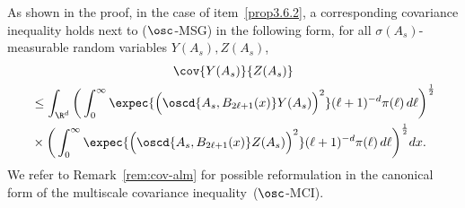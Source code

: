 \begin{rema}
As shown in the proof, in the case of item~\eqref{prop3.6.2}, a corresponding covariance inequality holds next to ($\osc$-MSG) in the following form, for all $\sigma(A_s)$-measurable random variables $Y(A_s),Z(A_s)$,
\begin{multline}\label{eq:MSG-RPM}
\cov{Y(A_s)}{Z(A_s)}\\
\begin{aligned}
&\le \int_{\R^d}\bigg(\int_0^\infty\expec{\Big(\oscd{A_s,B_{2\ell+1}(x)}Y(A_s)\Big)^2}(\ell+1)^{-d}\pi(\ell)\,d\ell\bigg)^\frac12\\
&\times\bigg(\int_0^\infty\expec{\Big(\oscd{A_s,B_{2\ell+1}(x)}Z(A_s)\Big)^2}(\ell+1)^{-d}\pi(\ell)\,d\ell\bigg)^\frac12dx.
\end{aligned}
\end{multline}
We refer to Remark~\ref{rem:cov-alm} for possible reformulation in the canonical form of the multiscale covariance inequality~($\osc$-MCI).
\end{rema}

